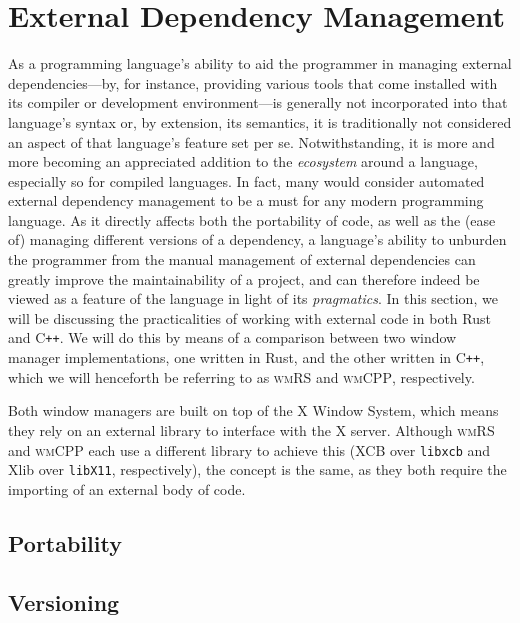 \section{External Dependency Management}

As a programming  language's ability to aid the programmer  in managing external
dependencies---by,  for instance,  providing various  tools that  come installed
with  its compiler  or development  environment---is generally  not incorporated
into that language's syntax or, by extension, its semantics, it is traditionally
not considered an aspect of that language's feature set per se. Notwithstanding,
it is more  and more becoming an appreciated addition  to the \textit{ecosystem}
around a  language, especially so  for compiled  languages. In fact,  many would
consider automated  external dependency management to  be a must for  any modern
programming language.  As it directly affects  both the portability of  code, as
well as the (ease of) managing  different versions of a dependency, a language's
ability  to unburden  the  programmer  from the  manual  management of  external
dependencies  can greatly  improve the  maintainability  of a  project, and  can
therefore  indeed be  viewed  as a  feature  of  the language  in  light of  its
\textit{pragmatics}. In this  section, we will be  discussing the practicalities
of working with external code in both  Rust and C\texttt{++}. We will do this by
means of a comparison between two window manager implementations, one written in
Rust,  and the  other  written  in C\texttt{++},  which  we  will henceforth  be
referring to as \textsc{wmRS} and \textsc{wmCPP}, respectively.

Both  window managers  are built  on top  of the  X Window  System, which  means
they  rely on  an external  library  to interface  with the  X server.  Although
\textsc{wmRS} and  \textsc{wmCPP} each use  a different library to  achieve this
(XCB  over \texttt{libxcb}  and  Xlib over  \texttt{libX11}, respectively),  the
concept is the same,  as they both require the importing of  an external body of
code.

\subsection{Portability}
{ \textcolor{gray}\blindtext }

\subsection{Versioning}
{ \textcolor{gray}\blindtext }
